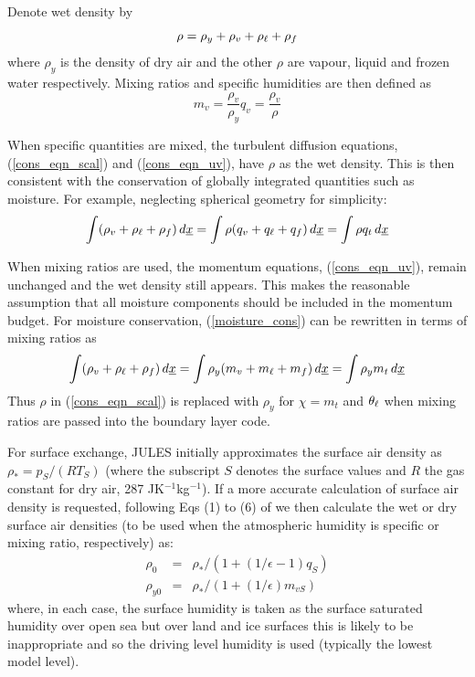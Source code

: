 \documentclass{UMDP_article}
\begin{document}
Denote wet density by 
\begin{equation*}
  \rho = \rho_y + \rho_v + \rho_{\ell} + \rho_{f}
\end{equation*}
where $\rho_y$ is the density of dry air and the other $\rho$ are
vapour, liquid and frozen water respectively.  Mixing ratios and
specific humidities are then defined as
\begin{equation*}
  m_v = \frac{\rho_v}{\rho_y}  q_v = \frac{\rho_v}{\rho} 
\end{equation*}

When specific quantities are mixed, the turbulent diffusion equations,
(\ref{cons_eqn_scal}) and (\ref{cons_eqn_uv}), have $\rho$ as the wet
density.  This is then consistent with the conservation of globally
integrated quantities such as moisture.  For example, neglecting
spherical geometry for simplicity:
\begin{equation}
  \int (\rho_v + \rho_{\ell} + \rho_{f})\, d\underline{x} = 
  \int \rho (q_v + q_{\ell} + q_{f}) \,d\underline{x} = \int \rho q_t \, d\underline{x}
\label{moisture_cons}
\end{equation}

When mixing ratios are used, the momentum equations,
(\ref{cons_eqn_uv}), remain unchanged and the wet density still
appears.  This makes the reasonable assumption that all moisture
components should be included in the momentum budget.  For moisture
conservation, (\ref{moisture_cons}) can be rewritten in terms of
mixing ratios as
\begin{equation*}
  \int (\rho_v + \rho_{\ell} + \rho_{f})\, d\underline{x} = 
  \int \rho_y (m_v + m_{\ell} + m_{f}) \,d\underline{x} = \int \rho_y m_t \, d\underline{x}
\end{equation*}
Thus $\rho$ in (\ref{cons_eqn_scal}) is replaced with $\rho_y$ for
$\chi = m_t$ and $\theta_{\ell}$ when mixing ratios are passed into the
boundary layer code.  

For surface exchange, JULES initially approximates the surface air density as 
$\rho_* = p_S/(R T_S)$ (where the subscript $S$ denotes the surface values and $R$ 
the gas constant for dry air, 287 JK$^{-1}$kg$^{-1}$).  If a more accurate calculation 
of surface air density is requested, following Eqs (1) to (6) of 
\cite{Webbetal1980} we then calculate the wet or dry surface air densities (to be 
used when the atmospheric humidity is specific or mixing ratio, respectively) as:
\begin{eqnarray*}
     \rho_{0} & =& \rho_*/(1+(1/\epsilon-1)q_S) \\
     \rho_{y0} & =& \rho_*/(1+(1/\epsilon)m_{vS})
\end{eqnarray*}
where, in each case, the surface humidity is taken as the surface saturated humidity 
over open sea but over land and ice surfaces this is likely to be inappropriate 
and so the driving level humidity is used (typically the lowest model level).
\end{document}
